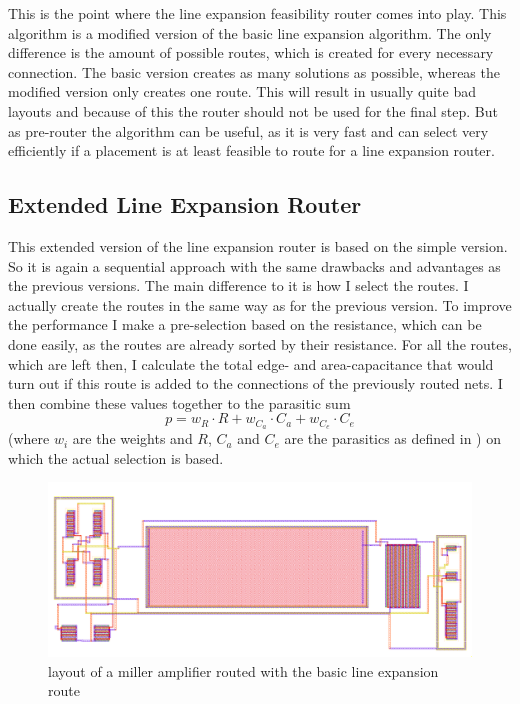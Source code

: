 This is the point where the line expansion feasibility router comes into play. This algorithm is a modified version of the basic line expansion algorithm. The only difference is the amount of possible routes, which is created for every necessary connection. The basic version creates as many solutions as possible, whereas the modified version only creates one route. This will result in usually quite bad layouts and because of this the router should not be used for the final step. But as pre-router the algorithm can be useful, as it is very fast and can select very efficiently if a placement is at least feasible to route for a line expansion router.

\subsection{Extended Line Expansion Router}
This extended version of the line expansion router is based on the simple version. So it is again a sequential approach with the same drawbacks and advantages as the previous versions. The main difference to it is how I select the routes. I actually create the routes in the same way as for the previous version. To improve the performance I make a pre-selection based on the resistance, which can be done easily, as the routes are already sorted by their resistance. For all the routes, which are left then, I calculate the total edge- and area-capacitance that would turn out if this route is added to the connections of the previously routed nets. I then combine these values together to the parasitic sum
\begin{equation}
	\label{eq:extended_line_expansion_objective}
	p = w_R \cdot R + w_{C_a} \cdot C_a + w_{C_e} \cdot C_e
\end{equation}
(where $w_i$ are the weights and $R$, $C_a$ and $C_e$ are the parasitics as defined in ) on which the actual selection is based.

\begin{figure}
	\centering
	\includegraphics[scale=.4]{FIG/miller_amplifier_routed_extended_line_expansion_2.png}
  	\caption{layout of a miller amplifier routed with the basic line expansion route}
	\label{fig:miller_amplifier_routed_extended_line_expansion_2}
\end{figure}	